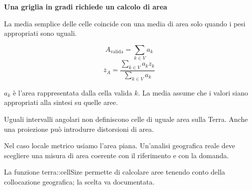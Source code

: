 \documentclass[12pt,aspectratio=1610]{beamer}
\newcommand{\PBody}[1]{\par{\fontsize{11.3}{14.8}\selectfont #1\par}}
\newcommand{\PSmall}[1]{\par{\fontsize{9.8}{13.1}\selectfont #1\par}}
\newcommand{\PInfo}[1]{%
\begin{tcolorbox}[enhanced,arc=1.6mm,boxrule=.55pt,colback=GeoTint,
 colframe=Rule!80!Classical,left=2.3mm,right=2.3mm,top=2mm,bottom=2mm,
 before skip=1mm,after skip=1mm]
\PSmall{#1}\end{tcolorbox}}
\begin{document}
\begin{frame}[plain]\hypertarget{slide28}{}
\begin{lrbox}{\TitleBox}
\begin{minipage}[t]{17.7cm}\raggedright\color{Ink}\fontsize{11.3}{14.8}\selectfont
\color{Navy}\bfseries\fontsize{20.6}{24.5}\selectfont Una griglia in gradi richiede un calcolo di area
\end{minipage}\end{lrbox}

\begin{lrbox}{\RecallBox}
\begin{minipage}[t]{14.3cm}\raggedright\color{Ink}\fontsize{11.3}{14.8}\selectfont
\fontsize{10.3}{13.8}\selectfont La media semplice delle celle coincide con una media di area solo quando i pesi appropriati sono uguali.
\end{minipage}\end{lrbox}

\begin{lrbox}{\PilotLeftBox}
\begin{minipage}[t]{10.05cm}\raggedright\color{Ink}\fontsize{11.3}{14.8}\selectfont
\[A_{\mathrm{valida}}=\sum_{k\in V}a_k\]
\[\overline z_A=\frac{\sum_{k\in V}a_k z_k}{\sum_{k\in V}a_k}\]
\PInfo{$a_k$ è l’area rappresentata dalla cella valida $k$. La media assume che i valori siano appropriati alla sintesi su quelle aree.}

\end{minipage}\end{lrbox}

\begin{lrbox}{\PilotRightBox}
\begin{minipage}[t]{7.55cm}\raggedright\color{Ink}\fontsize{11.3}{14.8}\selectfont
\PBody{Uguali intervalli angolari non definiscono celle di uguale area sulla Terra. Anche una proiezione può introdurre distorsioni di area.}
\vspace{2.5mm}
\PBody{Nel caso locale metrico usiamo l’area piana. Un’analisi geografica reale deve scegliere una misura di area coerente con il riferimento e con la domanda.}
\vspace{2.5mm}
\PSmall{La funzione terra::cellSize permette di calcolare aree tenendo conto della collocazione geografica; la scelta va documentata.}


\end{minipage}
\end{lrbox}
\end{frame}
\end{document}
